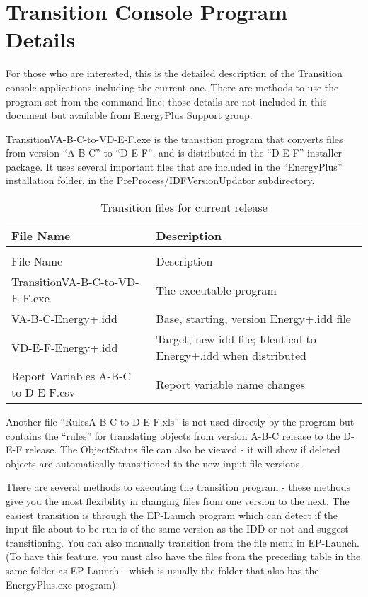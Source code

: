 \section{Transition Console Program Details}\label{transition-console-program-details}

For those who are interested, this is the detailed description of the Transition console applications including the current one. There are methods to use the program set from the command line; those details are not included in this document but available from EnergyPlus Support group.

TransitionVA-B-C-to-VD-E-F.exe is the transition program that converts files from version ``A-B-C'' to ``D-E-F'', and is distributed in the ``D-E-F'' installer package. It uses several important files that are included in the ``EnergyPlus'' installation folder, in the PreProcess/IDFVersionUpdator subdirectory.

\begin{longtable}[c]{p{2.14in}p{3.85in}}
\caption{Transition files for current release \label{table:transition-files-for-current-release}} \tabularnewline
\toprule 
File Name & Description \tabularnewline
\midrule
\endfirsthead

\caption[]{Transition files for current release} \tabularnewline
\toprule 
File Name & Description \tabularnewline
\midrule
\endhead

TransitionVA-B-C-to-VD-E-F.exe & The executable program \tabularnewline
VA-B-C-Energy+.idd & Base, starting, version Energy+.idd file \tabularnewline
VD-E-F-Energy+.idd & Target, new idd file; Identical to Energy+.idd when distributed \tabularnewline
Report Variables A-B-C to D-E-F.csv & Report variable name changes \tabularnewline
\bottomrule
\end{longtable}

Another file ``RulesA-B-C-to-D-E-F.xls'' is not used directly by the program but contains the ``rules'' for translating objects from version A-B-C release to the D-E-F release. The ObjectStatus file can also be viewed - it will show if deleted objects are automatically transitioned to the new input file versions.

There are several methods to executing the transition program - these methods give you the most flexibility in changing files from one version to the next. The easiest transition is through the EP-Launch program which can detect if the input file about to be run is of the same version as the IDD or not and suggest transitioning. You can also manually transition from the file menu in EP-Launch. (To have this feature, you must also have the files from the preceding table in the same folder as EP-Launch - which is usually the folder that also has the EnergyPlus.exe program).

